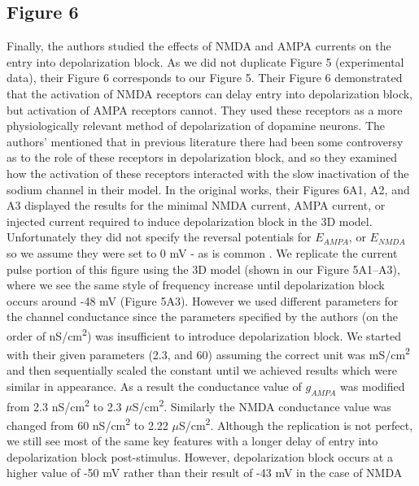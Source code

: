 \subsection{Figure 6}
Finally, the authors studied the effects of NMDA and AMPA currents on the entry into depolarization block. As we did not duplicate Figure 5 (experimental data), their Figure 6 corresponds to our Figure 5. Their Figure 6 demonstrated that the activation of NMDA receptors can delay entry into depolarization block, but activation of AMPA receptors cannot. They used these receptors as a more physiologically relevant method of depolarization of dopamine neurons. The authors’ mentioned that in previous literature there had been some controversy as to the role of these receptors in depolarization block, and so they examined how the activation of these receptors interacted with the slow inactivation of the sodium channel in their model. In the original works, their Figures 6A1, A2, and A3 displayed the results for the minimal NMDA current, AMPA current, or injected current required to induce depolarization block in the 3D model. Unfortunately they did not specify the reversal potentials for $E_{AMPA}$, or $E_{NMDA}$ so we assume they were set to 0 mV - as is common \cite{neuroscience_2001}. We replicate the current pulse portion of this figure using the 3D model (shown in our Figure 5A1--A3), where we see the same style of frequency increase until depolarization block occurs around -48 mV (Figure 5A3). However we used different parameters for the channel conductance since the parameters specified by the authors (on the order of nS/cm\textsuperscript{2}) was insufficient to introduce depolarization block. We started with their given parameters (2.3, and 60) assuming the correct unit was mS/cm\textsuperscript{2} and then sequentially scaled the constant until we achieved results which were similar in appearance. As a result the conductance value of $g_{AMPA}$ was modified from 2.3 nS/cm\textsuperscript{2} to 2.3 $\mu$S/cm\textsuperscript{2}. Similarly the NMDA conductance value was changed from 60 nS/cm\textsuperscript{2} to 2.22 $\mu$S/cm\textsuperscript{2}. Although the replication is not perfect, we still see most of the same key features with a longer delay of entry into depolarization block post-stimulus. However, depolarization block occurs at a higher value of -50 mV rather than their result of -43 mV in the case of NMDA

